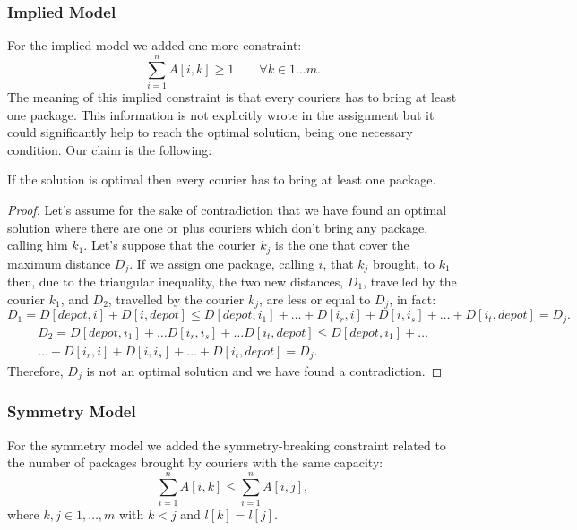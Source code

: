 \begin{itemize}
    \subsubsection{Implied Model}
    For the implied model we added one more constraint:
    \begin{equation}
        \sum_{i = 1}^{n} A[i,k] \geq 1 \qquad \forall k \in 1 \dots m.
    \end{equation}
    The meaning of this implied constraint is that every couriers has to bring at least one package. This information is not explicitly wrote in the assignment but it could significantly help to reach the optimal solution, being one necessary condition. Our claim is the following:
    \begin{lem}
    If the solution is optimal then every courier has to bring at least one package.
    \end{lem}
    \begin{proof}
    Let's assume for the sake of contradiction that we have found an optimal solution where there are one or plus couriers which don't bring any package, calling him $k_1$. Let's suppose that the courier $k_j$ is the one that cover the maximum distance $D_j$. If we assign one package, calling $i$, that $k_j$ brought, to $k_1$ then, due to the triangular inequality, the two new distances, $D_1$, travelled by the courier $k_1$, and $D_2$, travelled by the courier $k_j$, are less or equal to $D_j$, in fact:
    \begin{equation}
    D_1 = D[depot,i] + D[i,depot] \leq D[depot, i_1] + \dots + D[i_r, i] + D[i, i_s] + \dots + D[i_t, depot] = D_j.
    \end{equation}
    \begin{align}
    D_2 = D[depot,i_1] + \dots D[i_r,i_s] + \dots D[i_t, depot] \leq D[depot, i_1]
    + \dots \\
    \dots + D[i_r, i] + D[i, i_s] + \dots + D[i_t, depot] = D_j.
    \end{align}
    Therefore, $D_j$ is not an optimal solution and we have found a contradiction.
    \end{proof}
    
    \subsubsection{Symmetry Model}
    For the symmetry model we added the symmetry-breaking constraint related to the number of packages brought by couriers with the same capacity:
    \begin{equation}
    \sum_{i = 1}^{n} A[i,k] \leq \sum_{i = 1}^n A[i,j],
    \end{equation}
    where $k,j \in 1, \dots, m$ with $k < j$ and $l[k] = l[j]$.
\end{itemize}



